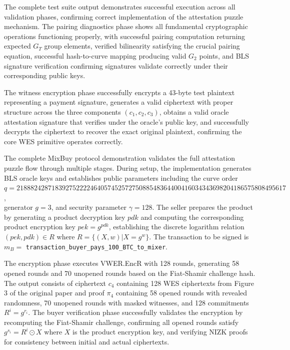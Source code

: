\documentclass[11pt,a4paper]{article}
\begin{document}
{The complete test suite output demonstrates successful execution across all validation phases, confirming correct implementation of the attestation puzzle mechanism. The pairing diagnostics phase shows all fundamental cryptographic operations functioning properly, with successful pairing computation returning expected $G_T$ group elements, verified bilinearity satisfying the crucial pairing equation, successful hash-to-curve mapping producing valid $G_2$ points, and BLS signature verification confirming signatures validate correctly under their corresponding public keys.

The witness encryption phase successfully encrypts a 43-byte test plaintext representing a payment signature, generates a valid ciphertext with proper structure across the three components $(c_1, c_2, c_3)$, obtains a valid oracle attestation signature that verifies under the oracle's public key, and successfully decrypts the ciphertext to recover the exact original plaintext, confirming the core WES primitive operates correctly.

The complete MixBuy protocol demonstration validates the full attestation puzzle flow through multiple stages. During setup, the implementation generates BLS oracle keys and establishes public parameters including the curve order \\ $q = 21888242871839275222246405745257275088548364400416034343698204186575808495617$,\\ generator $g = 3$, and security parameter $\gamma = 128$. The seller prepares the product by generating a product decryption key $pdk$ and computing the corresponding product encryption key $pek = g^{pdk}$, establishing the discrete logarithm relation $(pek, pdk) \in R$ where $R = \{(X, w) | X = g^w\}$. The transaction to be signed is $m_B =$ \texttt{transaction\_buyer\_pays\_100\_BTC\_to\_mixer}.

The encryption phase executes VWER.EncR with 128 rounds, generating 58 opened rounds and 70 unopened rounds based on the Fiat-Shamir challenge hash. The output consists of ciphertext $c_4$ containing 128 WES ciphertexts from Figure 3 of the original paper and proof $\pi_4$ containing 58 opened rounds with revealed randomness, 70 unopened rounds with masked witnesses, and 128 commitments $R^i = g^{r_i}$. The buyer verification phase successfully validates the encryption by recomputing the Fiat-Shamir challenge, confirming all opened rounds satisfy $g^{s_i} = R^i \odot X$ where $X$ is the product encryption key, and verifying NIZK proofs for consistency between initial and actual ciphertexts.

}
\end{document}
